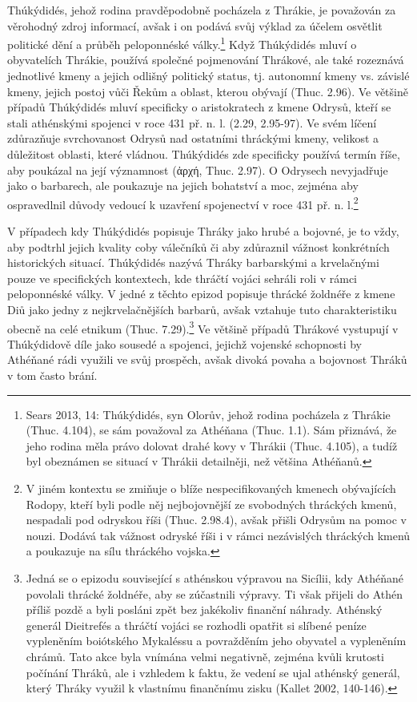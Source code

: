 Thúkýdidés, jehož rodina pravděpodobně pocházela z Thrákie, je považován za věrohodný zdroj informací, avšak i on podává svůj výklad za účelem osvětlit politické dění a průběh peloponnéské války.\footnote{Sears 2013, 14: Thúkýdidés, syn Olorův, jehož rodina pocházela z Thrákie (Thuc. 4.104), se sám považoval za Athéňana (Thuc. 1.1). Sám přiznává, že jeho rodina měla právo dolovat drahé kovy v Thrákii (Thuc. 4.105), a tudíž byl obeznámen se situací v Thrákii detailněji, než většina Athéňanů.} Když Thúkýdidés mluví o obyvatelích Thrákie, používá společné pojmenování Thrákové, ale také rozeznává jednotlivé kmeny a jejich odlišný politický status, tj. autonomní kmeny vs. závislé kmeny, jejich postoj vůči Řekům a oblast, kterou obývají (Thuc. 2.96). Ve většině případů Thúkýdidés mluví specificky o aristokratech z kmene Odrysů, kteří se stali athénskými spojenci v roce 431 př. n. l. (2.29, 2.95-97). Ve svém líčení zdůrazňuje svrchovanost Odrysů nad ostatními thráckými kmeny, velikost a důležitost oblasti, které vládnou. Thúkýdidés zde specificky používá termín říše, aby poukázal na její významnost (ἀρχή, Thuc. 2.97). O Odrysech nevyjadřuje jako o barbarech, ale poukazuje na jejich bohatství a moc, zejména aby ospravedlnil důvody vedoucí k uzavření spojenectví v roce 431 př. n. l.\footnote{V jiném kontextu se zmiňuje o blíže nespecifikovaných kmenech obývajících Rodopy, kteří byli podle něj nejbojovnější ze svobodných thráckých kmenů, nespadali pod odryskou říši (Thuc. 2.98.4), avšak přišli Odrysům na pomoc v nouzi. Dodává tak vážnost odryské říši i v rámci nezávislých thráckých kmenů a poukazuje na sílu thráckého vojska.}

V případech kdy Thúkýdidés popisuje Thráky jako hrubé a bojovné, je to vždy, aby podtrhl jejich kvality coby válečníků či aby zdůraznil vážnost konkrétních historických situací. Thúkýdidés nazývá Thráky barbarskými a krvelačnými pouze ve specifických kontextech, kde thráčtí vojáci sehráli roli v rámci peloponnéské války. V jedné z těchto epizod popisuje thrácké žoldnéře z kmene Diů jako jedny z nejkrvelačnějších barbarů, avšak vztahuje tuto charakteristiku obecně na celé etnikum (Thuc. 7.29).\footnote{Jedná se o epizodu související s athénskou výpravou na Sicílii, kdy Athéňané povolali thrácké žoldnéře, aby se zúčastnili výpravy. Ti však přijeli do Athén příliš pozdě a byli posláni zpět bez jakékoliv finanční náhrady. Athénský generál Dieitrefés a thráčtí vojáci se rozhodli opatřit si slíbené peníze vypleněním boiótského Mykaléssu a povražděním jeho obyvatel a vypleněním chrámů. Tato akce byla vnímána velmi negativně, zejména kvůli krutosti počínání Thráků, ale i vzhledem k faktu, že vedení se ujal athénský generál, který Thráky využil k vlastnímu finančnímu zisku (Kallet 2002, 140-146).} Ve většině případů Thrákové vystupují v Thúkýdidově díle jako sousedé a spojenci, jejichž vojenské schopnosti by Athéňané rádi využili ve svůj prospěch, avšak divoká povaha a bojovnost Thráků v tom často brání.

